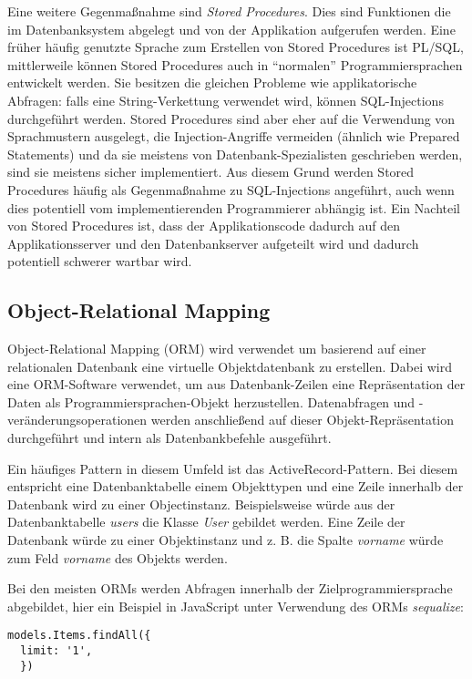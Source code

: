 	Eine weitere Gegenmaßnahme sind \textit{Stored Procedures}. Dies sind Funktionen die im Datenbanksystem abgelegt und von der Applikation aufgerufen werden. Eine früher häufig genutzte Sprache zum Erstellen von Stored Procedures ist PL/SQL, mittlerweile können Stored Procedures auch in ``normalen'' Programmiersprachen entwickelt werden. Sie besitzen die gleichen Probleme wie applikatorische Abfragen: falls eine String-Verkettung verwendet wird, können SQL-Injections durchgeführt werden. Stored Procedures sind aber eher auf die Verwendung von Sprachmustern ausgelegt, die Injection-Angriffe vermeiden (ähnlich wie Prepared Statements) und da sie meistens von Datenbank-Spezialisten geschrieben werden, sind sie meistens sicher implementiert. Aus diesem Grund werden Stored Procedures häufig als Gegenmaßnahme zu SQL-Injections angeführt, auch wenn dies potentiell vom implementierenden Programmierer abhängig ist. Ein Nachteil von Stored Procedures ist, dass der Applikationscode dadurch auf den Applikationsserver und den Datenbankserver aufgeteilt wird und dadurch potentiell schwerer wartbar wird.

\subsection{Object-Relational Mapping}

Object-Relational Mapping (ORM) wird verwendet um basierend auf einer relationalen Datenbank eine virtuelle Objektdatenbank zu erstellen. Dabei wird eine ORM-Software verwendet, um aus Datenbank-Zeilen eine Repräsentation der Daten als Programmiersprachen-Objekt herzustellen. Datenabfragen und -veränderungsoperationen werden anschließend auf dieser Objekt-Repräsentation durchgeführt und intern als Datenbankbefehle ausgeführt.

Ein häufiges Pattern in diesem Umfeld ist das ActiveRecord-Pattern. Bei diesem entspricht eine Datenbanktabelle einem Objekttypen und eine Zeile innerhalb der Datenbank wird zu einer Objectinstanz. Beispielsweise würde aus der Datenbanktabelle \textit{users} die Klasse \textit{User} gebildet werden. Eine Zeile der Datenbank würde zu einer Objektinstanz und z. B. die Spalte \textit{vorname} würde zum Feld \textit{vorname} des Objekts werden.

Bei den meisten ORMs werden Abfragen innerhalb der Zielprogrammiersprache abgebildet, hier ein Beispiel in JavaScript unter Verwendung des ORMs \textit{sequalize}:

\begin{verbatim}
models.Items.findAll({
  limit: '1',
  })
\end{verbatim}

